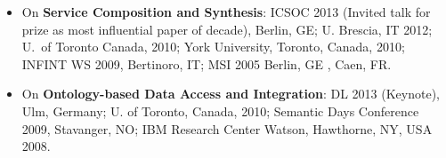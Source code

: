 \begin{itemize}[topsep=0pt,itemsep=-1ex,partopsep=1ex,parsep=1ex]

\item 
On \textbf{Service Composition and Synthesis}: ICSOC 2013 (Invited talk for prize as  most influential paper of  decade), Berlin, GE; U. Brescia, IT 2012; U.\ of Toronto Canada, 2010; York University, Toronto, Canada, 2010; INFINT WS 2009, Bertinoro, IT; MSI 2005 Berlin, GE , Caen, FR.



\item 
On \textbf{Ontology-based Data Access and Integration}: DL 2013  (Keynote), Ulm, Germany; U.
 of Toronto, Canada, 2010; Semantic Days Conference 2009, Stavanger, NO; IBM Research Center Watson, Hawthorne, NY, USA 2008.

\end{itemize}




